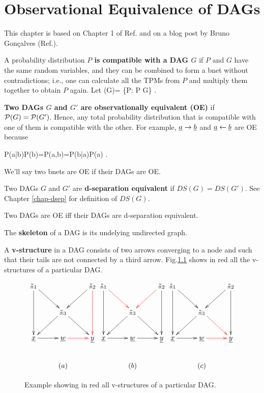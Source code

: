 \chapter{Observational
 Equivalence of DAGs}\label{ch-obs-equi}

This chapter is based on Chapter 1 of
Ref.\cite{pearl-2013book}
and on a blog post by 
Bruno Gon\c{c}alves 
(Ref.\cite{bruno-obs-equiv}).

A probability
distribution
{\bf $P$
is 
compatible 
with a DAG $G$}
if $P$ and $G$
have the
same random variables, and they 
can be
combined to form a bnet
without
contradictions;
i.e.,
one can calculate 
all
the TPMs from $P$
and multiply
them 
together to
obtain $P$ again.
Let 
\beq
\calp(G)=
\{P: P G\}
\;.
\eeq

 {\bf Two DAGs $G$ 
and $G'$ are observationally
equivalent (OE)}
if ${\cal P}(G)={\cal P}(G')$. Hence,
any total
probability distribution
that is compatible 
with one
of them
is compatible with
the other.
For example,
${\underline{a}}\rightarrow{\underline{b}}$
and ${\underline{a}}\leftarrow{\underline{b}}$
are OE because

\beq
P(a|b)P(b)=P(a,b)=P(b|a)P(a)
\label{eq-two-node-prob}
\;.
\eeq

We'll say two bnets are OE
if their DAGs are OE.

Two DAGs $G$ and $G'$
are
{\bf d-separation equivalent} if $DS(G)=DS(G')$.
See Chapter \ref{chap-dsep}
for definition of $DS(G)$.
\begin{claim}
Two DAGs are OE
iff their DAGs are d-separation equivalent.
\end{claim}


The {\bf
skeleton}
of a DAG is its
undelying undirected graph.

A {\bf v-structure}
in
a DAG consists of
two arrows 
converging to
a node and
such 
that their tails
are not 
connected 
by a third arrow.
Fig.\ref{fig-v-strucs}
shows in red all the v-structures 
of a particular DAG.

\begin{figure}[h!]
$$\xymatrix{
\rvz_1\ar[dd]\ar[rd]
&&\rvz_2\ar@[red][dd]\ar[ld]
\\
&\rvz_3\ar[dl]\ar[dr]
\\
\rvx\ar[r]&\rvw\ar@[red][r]&\rvy
\\
&(a)
}
\xymatrix{
\rvz_1\ar[dd]\ar@[red][rd]
&&\rvz_2\ar[dd]\ar@[red][ld]
\\
&\rvz_3\ar[dl]\ar[dr]
\\
\rvx\ar[r]&\rvw\ar[r]&\rvy
\\
&(b)
}
\xymatrix{
\rvz_1\ar[dd]\ar[rd]
&&\rvz_2\ar[dd]\ar[ld]
\\
&\rvz_3\ar[dl]\ar@[red][dr]
\\
\rvx\ar[r]&\rvw\ar@[red][r]&\rvy
\\
&(c)
}$$
\caption{Example showing in red
all v-structures 
of a particular DAG.}
\label{fig-v-strucs}
\end{figure}





